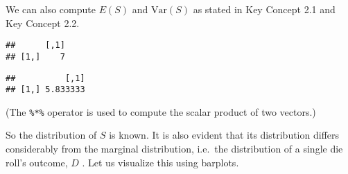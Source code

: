 \documentclass[]{book}
\newenvironment{Shaded}{\begin{snugshade}}{\end{snugshade}}
\newcommand{\KeywordTok}[1]{\textcolor[rgb]{0.13,0.29,0.53}{\textbf{#1}}}
\newcommand{\DecValTok}[1]{\textcolor[rgb]{0.00,0.00,0.81}{#1}}
\newcommand{\StringTok}[1]{\textcolor[rgb]{0.31,0.60,0.02}{#1}}
\newcommand{\CommentTok}[1]{\textcolor[rgb]{0.56,0.35,0.01}{\textit{#1}}}
\newcommand{\OperatorTok}[1]{\textcolor[rgb]{0.81,0.36,0.00}{\textbf{#1}}}
\newcommand{\NormalTok}[1]{#1}
\theoremstyle{definition}
\theoremstyle{definition}
\theoremstyle{definition}
\theoremstyle{remark}
\begin{document}
We can also compute \(E(S)\) and \(\text{Var}(S)\) as stated in Key
Concept 2.1 and Key Concept 2.2.

\begin{Shaded}
\end{Shaded}

\begin{verbatim}
##      [,1]
## [1,]    7
\end{verbatim}

\begin{Shaded}
\end{Shaded}

\begin{verbatim}
##          [,1]
## [1,] 5.833333
\end{verbatim}

(The \texttt{\%*\%} operator is used to compute the scalar product of
two vectors.)

So the distribution of \(S\) is known. It is also evident that its
distribution differs considerably from the marginal distribution,
i.e.~the distribution of a single die roll's outcome, \(D\) . Let us
visualize this using barplots.
\end{document}
